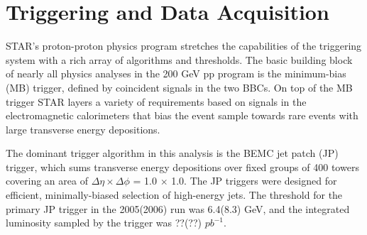 \section{Triggering and Data Acquisition}

STAR's proton-proton physics program stretches the capabilities of the triggering system with a rich array of algorithms and thresholds.  The basic building block of nearly all physics analyses in the 200 GeV pp program is the minimum-bias (MB) trigger, defined by coincident signals in the two BBCs.  On top of the MB trigger STAR layers a variety of requirements based on signals in the electromagnetic calorimeters that bias the event sample towards rare events with large transverse energy depositions.

The dominant trigger algorithm in this analysis is the BEMC jet patch (JP) trigger, which sums transverse energy depositions over fixed groups of 400 towers covering an area of $\Delta \eta \times \Delta \phi$ = 1.0 $\times$ 1.0.  The JP triggers were designed for efficient, minimally-biased selection of high-energy jets.  The threshold for the primary JP trigger in the 2005(2006) run was 6.4(8.3) GeV, and the integrated luminosity sampled by the trigger was ??(??) $pb^{-1}$.
